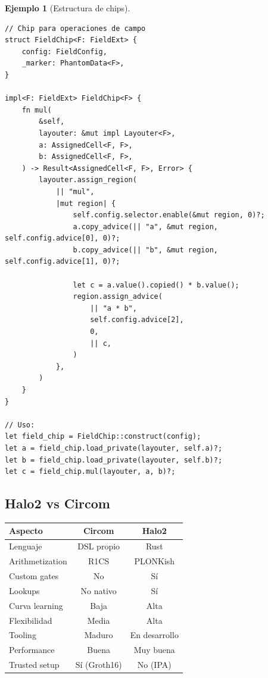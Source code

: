 \documentclass[11pt,a4paper,twoside,openright]{book}
\theoremstyle{definition}
\newtheorem{example}{Ejemplo}[chapter]
\theoremstyle{plain}
\theoremstyle{remark}
\begin{document}
\begin{example}[Estructura de chips]
\begin{verbatim}
// Chip para operaciones de campo
struct FieldChip<F: FieldExt> {
    config: FieldConfig,
    _marker: PhantomData<F>,
}

impl<F: FieldExt> FieldChip<F> {
    fn mul(
        &self,
        layouter: &mut impl Layouter<F>,
        a: AssignedCell<F, F>,
        b: AssignedCell<F, F>,
    ) -> Result<AssignedCell<F, F>, Error> {
        layouter.assign_region(
            || "mul",
            |mut region| {
                self.config.selector.enable(&mut region, 0)?;
                a.copy_advice(|| "a", &mut region, self.config.advice[0], 0)?;
                b.copy_advice(|| "b", &mut region, self.config.advice[1], 0)?;
                
                let c = a.value().copied() * b.value();
                region.assign_advice(
                    || "a * b",
                    self.config.advice[2],
                    0,
                    || c,
                )
            },
        )
    }
}

// Uso:
let field_chip = FieldChip::construct(config);
let a = field_chip.load_private(layouter, self.a)?;
let b = field_chip.load_private(layouter, self.b)?;
let c = field_chip.mul(layouter, a, b)?;
\end{verbatim}
\end{example}

\subsection{Halo2 vs Circom}

\begin{center}
\begin{tabular}{lcc}
\toprule
\textbf{Aspecto} & \textbf{Circom} & \textbf{Halo2} \\
\midrule
Lenguaje & DSL propio & Rust \\
Arithmetization & R1CS & PLONKish \\
Custom gates & No & Sí \\
Lookups & No nativo & Sí \\
Curva learning & Baja & Alta \\
Flexibilidad & Media & Alta \\
Tooling & Maduro & En desarrollo \\
Performance & Buena & Muy buena \\
Trusted setup & Sí (Groth16) & No (IPA) \\
\bottomrule
\end{tabular}
\end{center}
\end{document}

